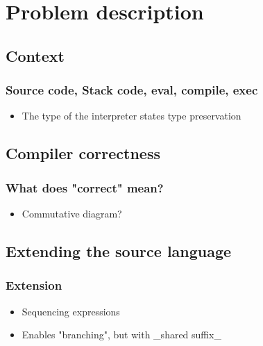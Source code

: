 \section{Problem description}

    \subsection{Context}
        \begin{frame}
            \frametitle{Source code, Stack code, eval, compile, exec}

            \begin{itemize}
                \item The type of the interpreter states type preservation
            \end{itemize}

        \end{frame}


    \subsection{Compiler correctness}
        \begin{frame}
            \frametitle{What does "correct" mean?}

            \begin{itemize}
                \item Commutative diagram?
            \end{itemize}
        \end{frame}


    \subsection{Extending the source language}
        \begin{frame}
            \frametitle{Extension}

            \begin{itemize}
                \item Sequencing expressions
                \item Enables "branching", but with _shared suffix_
            \end{itemize}
        \end{frame}


